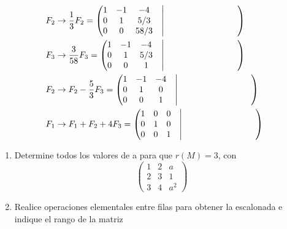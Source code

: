 \begin{ejem}
\begin{align*}
     &F_2 \rightarrow \frac{1}{3}F_2 = \begin{pmatrix}  1 & -1 & -4 &\bigm| \hspace*{3cm} \\ 0 & 1 & 5/3 &\bigm| \hspace*{3cm} \\  0 & 0 & 58/3 &\bigm| \hspace*{3cm} \end{pmatrix}\\
    &F_3 \rightarrow \frac{3}{58}F_3 = \begin{pmatrix}  1 & -1 & -4 &\bigm| \hspace*{3cm} \\ 0 & 1 & 5/3 &\bigm| \hspace*{3cm} \\  0 & 0 & 1 &\bigm| \hspace*{3cm} \end{pmatrix}\\
        &F_2 \rightarrow F_2 -\frac{5}{3}F_3 = \begin{pmatrix}  1 & -1 & -4 &\bigm| \hspace*{3cm} \\ 0 & 1 & 0 &\bigm| \hspace*{3cm} \\  0 & 0 & 1 &\bigm| \hspace*{3cm} \end{pmatrix}\\
                &F_1 \rightarrow F_1 +F_2+ 4F_3  = \begin{pmatrix}  1 & 0 & 0 &\bigm| \hspace*{3cm} \\ 0 & 1 & 0 &\bigm| \hspace*{3cm} \\  0 & 0 & 1 &\bigm| \hspace*{3cm} \end{pmatrix}
\end{align*}
\begin{ejer}
    \begin{enumerate}
        \item Determine todos los valores de a para que $r(M)=3$, con
            \[\begin{pmatrix}  1 & 2 & a\\ 2 &3 & 1\\3 & 4 & a^2\end{pmatrix}\]
        \item Realice operaciones elementales entre filas para obtener la escalonada e indique el rango de la matriz

\end{enumerate}
\end{ejer}
\end{ejem}
